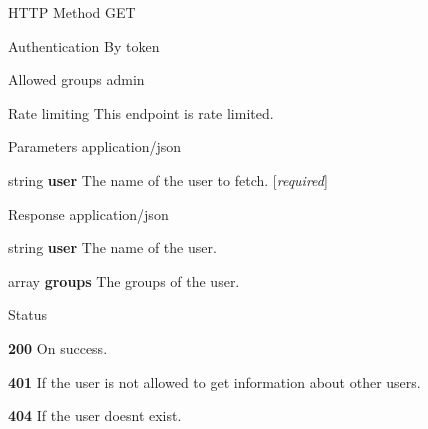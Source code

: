 \begin{DoxyParagraph}{H\+T\+TP Method}
G\+ET 
\end{DoxyParagraph}
\begin{DoxyParagraph}{Authentication}
By token 
\end{DoxyParagraph}
\begin{DoxyParagraph}{Allowed groups}
{\ttfamily admin} 
\end{DoxyParagraph}
\begin{DoxyParagraph}{Rate limiting}
This endpoint is rate limited.
\end{DoxyParagraph}
\begin{DoxyParagraph}{Parameters}
application/json
\begin{DoxyItemize}
\item {\ttfamily string} {\bfseries user} The name of the user to fetch. \mbox{[}{\itshape required}\mbox{]}
\end{DoxyItemize}
\end{DoxyParagraph}
\begin{DoxyParagraph}{Response}
application/json
\begin{DoxyItemize}
\item {\ttfamily string} {\bfseries user} The name of the user.
\item {\ttfamily array} {\bfseries groups} The groups of the user.
\end{DoxyItemize}
\end{DoxyParagraph}
\begin{DoxyParagraph}{Status}

\begin{DoxyItemize}
\item {\bfseries 200} On success.
\item {\bfseries 401} If the user is not allowed to get information about other users.
\item {\bfseries 404} If the user doesn\textquotesingle{}t exist. 
\end{DoxyItemize}
\end{DoxyParagraph}
